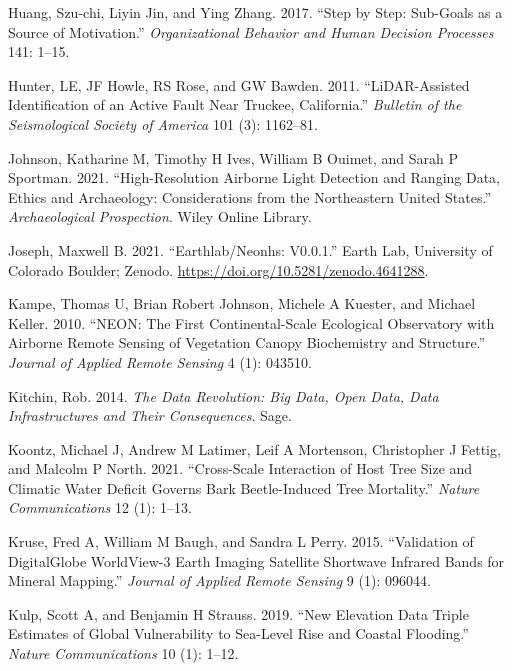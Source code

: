 \documentclass[
  12pt,
]{article}
\newlength{\cslhangindent}
\newlength{\cslentryspacingunit} %
\newenvironment{CSLReferences}[2] %
 {%
  \setlength{\parindent}{0pt}
  \ifodd #1
  \let\oldpar\par
  \def\par{\hangindent=\cslhangindent\oldpar}
  \fi
  \setlength{\parskip}{#2\cslentryspacingunit}
 }%
 {}
\begin{document}
\begin{CSLReferences}{1}{0}
\leavevmode{}%
Huang, Szu-chi, Liyin Jin, and Ying Zhang. 2017. {``Step by Step:
Sub-Goals as a Source of Motivation.''} \emph{Organizational Behavior
and Human Decision Processes} 141: 1--15.

\leavevmode{}%
Hunter, LE, JF Howle, RS Rose, and GW Bawden. 2011. {``LiDAR-Assisted
Identification of an Active Fault Near Truckee, California.''}
\emph{Bulletin of the Seismological Society of America} 101 (3):
1162--81.

\leavevmode{}%
Johnson, Katharine M, Timothy H Ives, William B Ouimet, and Sarah P
Sportman. 2021. {``High-Resolution Airborne Light Detection and Ranging
Data, Ethics and Archaeology: Considerations from the Northeastern
United States.''} \emph{Archaeological Prospection}. Wiley Online
Library.

\leavevmode{}%
Joseph, Maxwell B. 2021. {``Earthlab/Neonhs: V0.0.1.''} Earth Lab,
University of Colorado Boulder; Zenodo.
\url{https://doi.org/10.5281/zenodo.4641288}.

\leavevmode{}%
Kampe, Thomas U, Brian Robert Johnson, Michele A Kuester, and Michael
Keller. 2010. {``NEON: The First Continental-Scale Ecological
Observatory with Airborne Remote Sensing of Vegetation Canopy
Biochemistry and Structure.''} \emph{Journal of Applied Remote Sensing}
4 (1): 043510.

\leavevmode{}%
Kitchin, Rob. 2014. \emph{The Data Revolution: Big Data, Open Data, Data
Infrastructures and Their Consequences}. Sage.

\leavevmode{}%
Koontz, Michael J, Andrew M Latimer, Leif A Mortenson, Christopher J
Fettig, and Malcolm P North. 2021. {``Cross-Scale Interaction of Host
Tree Size and Climatic Water Deficit Governs Bark Beetle-Induced Tree
Mortality.''} \emph{Nature Communications} 12 (1): 1--13.

\leavevmode{}%
Kruse, Fred A, William M Baugh, and Sandra L Perry. 2015. {``Validation
of DigitalGlobe WorldView-3 Earth Imaging Satellite Shortwave Infrared
Bands for Mineral Mapping.''} \emph{Journal of Applied Remote Sensing} 9
(1): 096044.

\leavevmode{}%
Kulp, Scott A, and Benjamin H Strauss. 2019. {``New Elevation Data
Triple Estimates of Global Vulnerability to Sea-Level Rise and Coastal
Flooding.''} \emph{Nature Communications} 10 (1): 1--12.


\end{CSLReferences}
\end{document}

